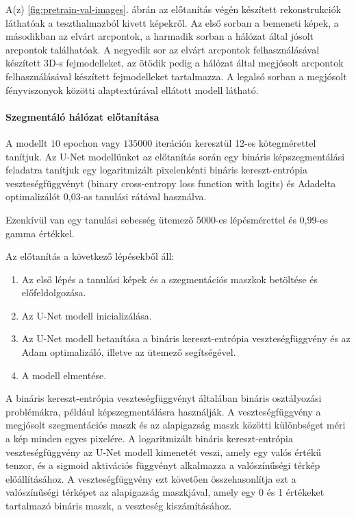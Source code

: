 \documentclass[12pt,a4]{article}
\begin{document}
        \clearpage
        
        A(z) \ref{fig:pretrain-val-images}. ábrán az előtanítás végén készített rekonstrukciók láthatóak a teszthalmazból kivett képekről. Az első sorban a bemeneti képek, a másodikban az elvárt arcpontok, a harmadik sorban a hálózat által jósolt arcpontok találhatóak. A negyedik sor az elvárt arcpontok felhasználásával készített 3D-s fejmodelleket, az ötödik pedig a hálózat által megjósolt arcpontok felhasználásával készített fejmodelleket tartalmazza. A legalsó sorban a megjósolt fényviszonyok közötti alaptextúrával ellátott modell látható.
        
        \paragraph{Szegmentáló hálózat előtanítása}
        
        A modellt $10$ epochon vagy $135000$ iteráción keresztül 12-es kötegmérettel tanítjuk. Az U-Net modellünket az előtanítás során egy bináris képszegmentálási feladatra tanítjuk egy logaritmizált pixelenkénti bináris kereszt-entrópia veszteségfüggvényt (binary cross-entropy loss function with logits) és  Adadelta optimalizálót 0,03-as tanulási rátával használva.
        
        Ezenkívül van egy tanulási sebesség ütemező 5000-es lépésmérettel és 0,99-es gamma értékkel.

        Az előtanítás a következő lépésekből áll:
            \begin{enumerate}
                \item Az első lépés a tanulási képek és a szegmentációs maszkok betöltése és előfeldolgozása.

                \item Az U-Net modell inicializálása.

                \item Az U-Net modell betanítása a bináris kereszt-entrópia veszteségfüggvény és az Adam optimalizáló, illetve az ütemező segítségével.

                \item A modell elmentése.
            \end{enumerate}

        A bináris kereszt-entrópia veszteségfüggvényt általában bináris osztályozási problémákra, például képszegmentálásra használják. A veszteségfüggvény a megjósolt szegmentációs maszk és az alapigazság maszk közötti különbséget méri a kép minden egyes pixelére. A logaritmizált bináris kereszt-entrópia veszteségfüggvény  az U-Net modell kimenetét veszi, amely egy valós értékű tenzor, és a sigmoid aktivációs függvényt alkalmazza a valószínűségi térkép előállításához. A veszteségfüggvény ezt követően összehasonlítja ezt a valószínűségi térképet az alapigazság maszkjával, amely egy 0 és 1 értékeket tartalmazó bináris maszk, a veszteség kiszámításához.
\end{document}
